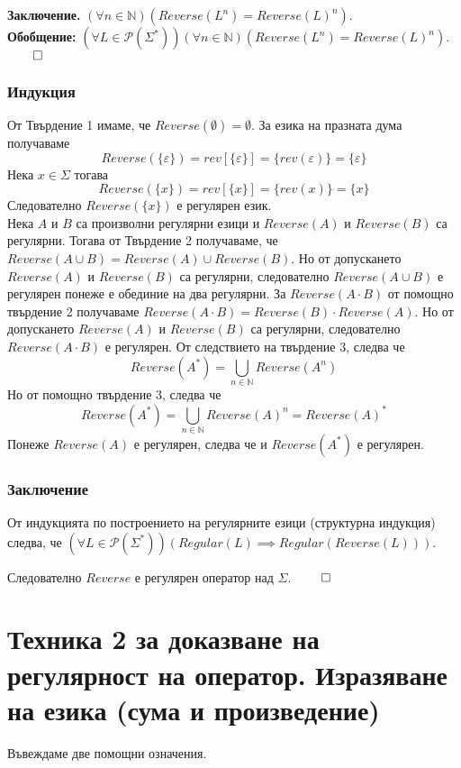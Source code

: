 \documentclass[12pt]{article}
\begin{document}
\textbf{Заключение.}
\((\forall n \in \mathbb N)( Reverse(L^n) = Reverse(L)^n)\). \\

\textbf{Обобщение:}
\((\forall L \in \mathcal{P}(\Sigma^*))(\forall n \in \mathbb N)( Reverse(L^n) = Reverse(L)^n)\). \(\qed\)

\subsubsection*{Индукция}
От Твърдение 1 имаме, че \(Reverse(\emptyset) = \emptyset\). За езика на празната дума получаваме
\[Reverse(\{\varepsilon\}) = rev[\{\varepsilon\}] = \{ rev(\varepsilon) \}  = \{ \varepsilon \}\]
Нека \(x \in \Sigma\) тогава 
\[Reverse(\{x\}) = rev[\{x\}] = \{ rev(x) \}  = \{ x \}\]
Следователно \(Reverse(\{x\})\) е регулярен език. \\
Нека \(A\) и \(B\) са произволни регулярни езици и \(Reverse(A)\) и \(Reverse(B)\) са регулярни.
Тогава от Твърдение 2 получаваме, че \(Reverse(A \cup B) = Reverse(A) \cup Reverse(B)\).
Но от допускането \(Reverse(A)\) и \(Reverse(B)\) са регулярни, следователно \(Reverse(A \cup B)\) е регулярен
понеже е обединие на два регулярни. За \(Reverse(A \cdot B)\) от помощно твърдение 2 получаваме
\(Reverse(A \cdot B) = Reverse(B) \cdot Reverse(A) \).
Но от допускането \(Reverse(A)\) и \(Reverse(B)\) са регулярни, следователно \(Reverse(A \cdot B)\) е регулярен.
От следствието на твърдение 3, следва че
\[Reverse(A^*) = \displaystyle\bigcup_{n \in \mathbb N} Reverse(A^n)\]
Но от помощно твърдение 3, следва че
\[Reverse(A^*) = \displaystyle\bigcup_{n \in \mathbb N} Reverse(A)^n = Reverse(A)^*\]
Понеже \(Reverse(A)\) е регулярен, следва че и \(Reverse(A^*)\) е регулярен.

\subsubsection*{Заключение}
От индукцията по построението на регулярните езици (структурна индукция) следва, че
\((\forall L \in \mathcal{P}(\Sigma^*))(Regular(L) \implies Regular(Reverse(L)))\).

Следователно \(Reverse\) е регулярен оператор над \(\Sigma\). \(\qed\)

\section*{Техника 2 за доказване на регулярност на оператор. Изразяване на езика (сума и произведение)}
Въвеждаме две помощни означения.
\end{document}
